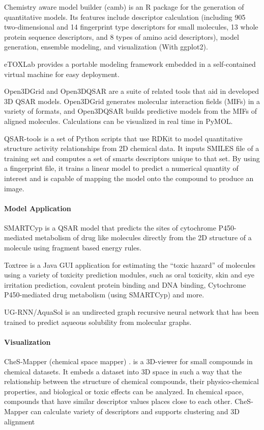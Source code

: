 Chemistry aware model builder (camb) \cite{Murrell_2015} is an R package for the generation of quantitative models. Its features include descriptor calculation (including 905 two-dimensional and 14 fingerprint type descriptors for small molecules, 13 whole protein sequence descriptors, and 8 types of amino acid descriptors), model generation, ensemble modeling, and visualization (With ggplot2).

eTOXLab \cite{Carri__2015} provides a portable modeling framework embedded in a self-contained virtual machine for easy deployment.

Open3DGrid and Open3DQSAR \cite{Tosco_2010} are a suite of related tools that aid in developed 3D QSAR models.  Open3DGrid generates molecular interaction fields (MIFs) in a variety of formats, and Open3DQSAR builds predictive models from the MIFs of aligned molecules.  Calculations can be visualized in real time in PyMOL.

QSAR-tools is a set of Python scripts that use RDKit to model quantitative structure activity relationships from 2D chemical data. It inputs SMILES file of a training set and computes a set of smarts descriptors unique to that set. By using a fingerprint file, it trains a linear model to predict a numerical quantity of interest and is capable of mapping the model onto the compound to produce an image.

\paragraph{Model Application}

SMARTCyp \cite{Rydberg_2010} is a QSAR model that predicts the sites of cytochrome P450-mediated metabolism of drug like molecules directly from the 2D structure of a molecule using fragment based energy rules.

Toxtree \cite{Patlewicz_2008} is a Java GUI application for estimating the ``toxic hazard'' of molecules using a variety of toxicity prediction modules, such as oral toxicity, skin  and eye irritation prediction, covalent protein binding and DNA binding, Cytochrome P450-mediated drug metabolism (using SMARTCyp) and more.

UG-RNN/AquaSol \cite{Lusci_2013} is an undirected graph recursive neural network that has been trained to predict aqueous solubility from molecular graphs. 

\paragraph{Visualization}
CheS-Mapper (chemical space mapper) \cite{G_tlein_2012,G_tlein_2014}. is a 3D-viewer for small compounds in chemical datasets. It embeds a dataset into 3D space in such a way that the relationship between the structure of chemical compounds, their physico-chemical properties, and biological or toxic effects can be analyzed. In chemical space, compounds that have similar descriptor values places close to each other. CheS-Mapper can calculate variety of descriptors and supports clustering and 3D alignment  

